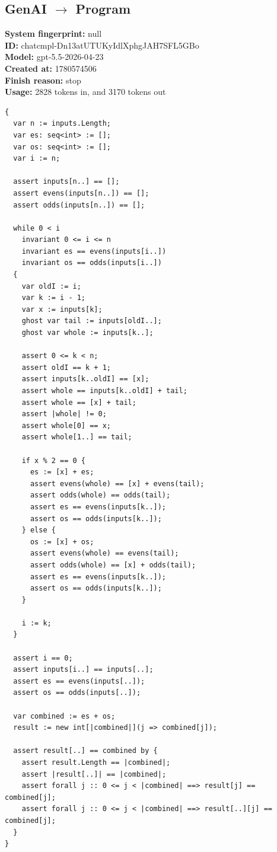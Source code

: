 \documentclass{article}
\begin{document}
\subsection*{GenAI $\rightarrow$ Program}
\textbf{System fingerprint: }null
\\\textbf{ID: }chatcmpl-Dn13atUTUKyIdlXphgJAH7SFL5GBo
\\\textbf{Model: }gpt-5.5-2026-04-23
\\\textbf{Created at: }1780574506
\\\textbf{Finish reason: }stop
\\\textbf{Usage: }2828 tokens in, and 3170 tokens out
\begin{lstlisting}
{
  var n := inputs.Length;
  var es: seq<int> := [];
  var os: seq<int> := [];
  var i := n;

  assert inputs[n..] == [];
  assert evens(inputs[n..]) == [];
  assert odds(inputs[n..]) == [];

  while 0 < i
    invariant 0 <= i <= n
    invariant es == evens(inputs[i..])
    invariant os == odds(inputs[i..])
  {
    var oldI := i;
    var k := i - 1;
    var x := inputs[k];
    ghost var tail := inputs[oldI..];
    ghost var whole := inputs[k..];

    assert 0 <= k < n;
    assert oldI == k + 1;
    assert inputs[k..oldI] == [x];
    assert whole == inputs[k..oldI] + tail;
    assert whole == [x] + tail;
    assert |whole| != 0;
    assert whole[0] == x;
    assert whole[1..] == tail;

    if x % 2 == 0 {
      es := [x] + es;
      assert evens(whole) == [x] + evens(tail);
      assert odds(whole) == odds(tail);
      assert es == evens(inputs[k..]);
      assert os == odds(inputs[k..]);
    } else {
      os := [x] + os;
      assert evens(whole) == evens(tail);
      assert odds(whole) == [x] + odds(tail);
      assert es == evens(inputs[k..]);
      assert os == odds(inputs[k..]);
    }

    i := k;
  }

  assert i == 0;
  assert inputs[i..] == inputs[..];
  assert es == evens(inputs[..]);
  assert os == odds(inputs[..]);

  var combined := es + os;
  result := new int[|combined|](j => combined[j]);

  assert result[..] == combined by {
    assert result.Length == |combined|;
    assert |result[..]| == |combined|;
    assert forall j :: 0 <= j < |combined| ==> result[j] == combined[j];
    assert forall j :: 0 <= j < |combined| ==> result[..][j] == combined[j];
  }
}
\end{lstlisting}
\end{document}
